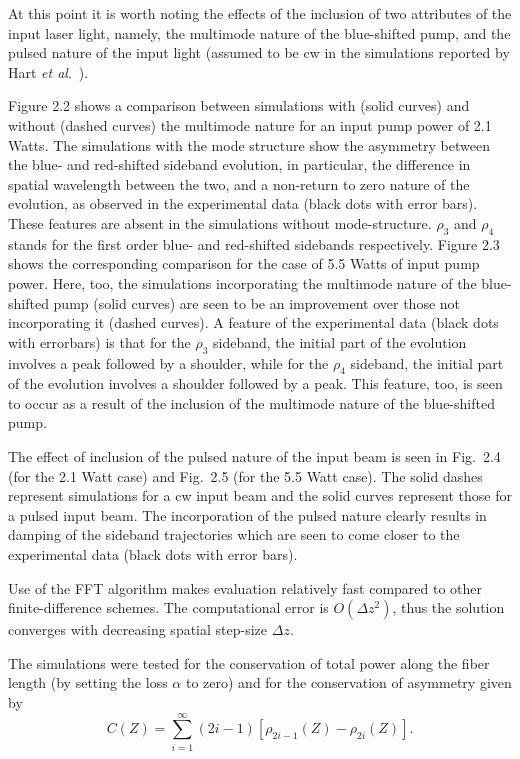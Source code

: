 At this point it is worth noting the effects of the inclusion of two attributes of 
the input laser light, namely, the multimode nature of the blue-shifted pump, and 
the pulsed nature of the input light (assumed to be cw in the simulations reported by 
Hart {\it et al}.\ \cite{hart1}). 

Figure 2.2 shows a comparison between simulations with (solid curves) and without (dashed curves) the multimode nature for an input pump power of 2.1 Watts. The simulations with the mode structure show the asymmetry between the blue- and red-shifted sideband evolution, in particular, the difference in spatial wavelength between the two, and a non-return to zero nature of the evolution, as observed in the experimental data (black dots with error bars). These features are absent in the simulations without mode-structure. $\rho_3$ and $\rho_4$ stands for the first order blue- and red-shifted sidebands respectively.  Figure 2.3 shows the corresponding comparison for the case of 5.5 Watts of input pump power.  Here, too, the simulations incorporating the multimode nature of the blue-shifted pump (solid curves) are seen to be an improvement over those not incorporating it (dashed curves). A feature of the experimental data (black dots with errorbars) is that for the $\rho_3$ sideband, the initial part of the evolution involves a peak followed by a shoulder, while for the $\rho_4$ sideband, the initial part of the evolution involves a shoulder followed by a peak. This feature, too, is seen to occur as a result of the inclusion of the multimode nature of the blue-shifted pump.  

The effect of inclusion of the pulsed nature of the input beam is seen in Fig.\ 2.4 (for the 2.1 Watt case) and Fig.\ 2.5 (for the 5.5 Watt case). The solid dashes represent simulations for a cw input beam and the solid curves represent those for a pulsed input beam. The incorporation of the pulsed nature clearly results in damping of the sideband trajectories which are seen to come closer to the experimental data \cite{hart1} (black dots with error bars). 

Use of the FFT algorithm makes evaluation relatively fast compared to other 
finite-difference schemes. The computational error is $O(\Delta z^2)$, thus 
the solution converges with decreasing spatial step-size $\Delta z$. 

The simulations were tested for the conservation of total power along the 
fiber length (by setting the loss $\alpha$ to zero) and for the conservation 
of asymmetry \cite{thompson1,hart1} given by 
\begin{equation}
C(Z) = \sum_{i=1}^{\infty}(2i-1)[\rho_{2i-1}(Z)-\rho_{2i}(Z)] .
\end{equation}

